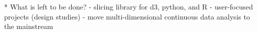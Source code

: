 * What is left to be done?
    - slicing library for d3, python, and R
    - user-focused projects (design studies)
    - move multi-dimensional continuous data analysis to the mainstream
